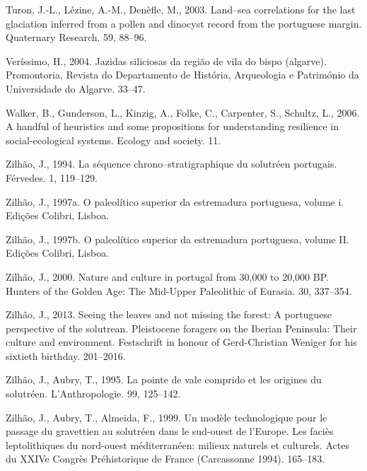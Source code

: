 \documentclass[12pt,twoside]{reedthesis}
\begin{document}
\leavevmode\hypertarget{ref-turon2003}{}%
Turon, J.-L., Lézine, A.-M., Denèfle, M., 2003. Land--sea correlations for the last glaciation inferred from a pollen and dinocyst record from the portuguese margin. Quaternary Research. 59, 88--96.

\leavevmode\hypertarget{ref-verissimo2004}{}%
Veríssimo, H., 2004. Jazidas siliciosas da região de vila do bispo (algarve). Promontoria, Revista do Departamento de História, Arqueologia e Património da Universidade do Algarve. 33--47.

\leavevmode\hypertarget{ref-walker2006}{}%
Walker, B., Gunderson, L., Kinzig, A., Folke, C., Carpenter, S., Schultz, L., 2006. A handful of heuristics and some propositions for understanding resilience in social-ecological systems. Ecology and society. 11.

\leavevmode\hypertarget{ref-zilhao1994}{}%
Zilhão, J., 1994. La séquence chrono--stratigraphique du solutréen portugais. Férvedes. 1, 119--129.

\leavevmode\hypertarget{ref-zilhao1997}{}%
Zilhão, J., 1997a. O paleolítico superior da estremadura portuguesa, volume i. Edições Colibri, Lisboa.

\leavevmode\hypertarget{ref-zilhao1997b}{}%
Zilhão, J., 1997b. O paleolítico superior da estremadura portuguesa, volume II. Edições Colibri, Lisboa.

\leavevmode\hypertarget{ref-zilhao2000}{}%
Zilhão, J., 2000. Nature and culture in portugal from 30,000 to 20,000 BP. Hunters of the Golden Age: The Mid-Upper Paleolithic of Eurasia. 30, 337--354.

\leavevmode\hypertarget{ref-zilhao2013}{}%
Zilhão, J., 2013. Seeing the leaves and not missing the forest: A portuguese perspective of the solutrean. Pleistocene foragers on the Iberian Peninsula: Their culture and environment. Festschrift in honour of Gerd-Christian Weniger for his sixtieth birthday. 201--2016.

\leavevmode\hypertarget{ref-zilhaoetal1995}{}%
Zilhão, J., Aubry, T., 1995. La pointe de vale comprido et les origines du solutréen. L'Anthropologie. 99, 125--142.

\leavevmode\hypertarget{ref-zilhaoetal1999}{}%
Zilhão, J., Aubry, T., Almeida, F., 1999. Un modèle technologique pour le passage du gravettien au solutréen dans le sud-ouest de l'Europe. Les faciès leptolithiques du nord-ouest méditerranéen: milieux naturels et culturels. Actes du XXIVe Congrès Préhistorique de France (Carcassonne 1994). 165--183.
\end{document}
